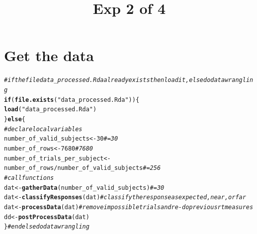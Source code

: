 \documentclass[a4paper,12pt,twoside]{article}\usepackage[]{graphicx}\usepackage[]{color}
\title{Exp 2 of 4}
\makeatletter
\newcommand{\hlnum}[1]{\textcolor[rgb]{0.686,0.059,0.569}{#1}}%
\newcommand{\hlstr}[1]{\textcolor[rgb]{0.192,0.494,0.8}{#1}}%
\newcommand{\hlcom}[1]{\textcolor[rgb]{0.678,0.584,0.686}{\textit{#1}}}%
\newcommand{\hlopt}[1]{\textcolor[rgb]{0,0,0}{#1}}%
\newcommand{\hlstd}[1]{\textcolor[rgb]{0.345,0.345,0.345}{#1}}%
\newcommand{\hlkwa}[1]{\textcolor[rgb]{0.161,0.373,0.58}{\textbf{#1}}}%
\newcommand{\hlkwb}[1]{\textcolor[rgb]{0.69,0.353,0.396}{#1}}%
\newcommand{\hlkwd}[1]{\textcolor[rgb]{0.737,0.353,0.396}{\textbf{#1}}}%
\newenvironment{kframe}{%
 \def\at@end@of@kframe{}%
 \ifinner\ifhmode%
  \def\at@end@of@kframe{\end{minipage}}%
  \begin{minipage}{\columnwidth}%
 \fi\fi%
 \def\FrameCommand##1{\hskip\@totalleftmargin \hskip-\fboxsep
 \colorbox{shadecolor}{##1}\hskip-\fboxsep
     \hskip-\linewidth \hskip-\@totalleftmargin \hskip\columnwidth}%
 \MakeFramed {\advance\hsize-\width
   \@totalleftmargin\z@ \linewidth\hsize
   \@setminipage}}%
 {\par\unskip\endMakeFramed%
 \at@end@of@kframe}
\newenvironment{knitrout}{}{} %
\makeatother
\begin{document}
\maketitle
\tableofcontents
\clearpage














\clearpage
\section{Get the data}

\begin{knitrout}\scriptsize
{}\color{fgcolor}\begin{kframe}
\begin{alltt}
\hlcom{# if the file data_processed.Rda already exists then load it, else do data wrangling}
\hlkwa{if} \hlstd{(}\hlkwd{file.exists}\hlstd{(}\hlstr{"data_processed.Rda"}\hlstd{)) \{}
    \hlkwd{load}\hlstd{(}\hlstr{"data_processed.Rda"}\hlstd{)}
\hlstd{\}} \hlkwa{else} \hlstd{\{}
    \hlcom{# declare local variables}
    \hlstd{number_of_valid_subjects} \hlkwb{<-} \hlnum{30}  \hlcom{# = 30}
    \hlstd{number_of_rows} \hlkwb{<-} \hlnum{7680}  \hlcom{# 7680}
    \hlstd{number_of_trials_per_subject} \hlkwb{<-} \hlstd{number_of_rows}\hlopt{/}\hlstd{number_of_valid_subjects}  \hlcom{# = 256}
    \hlcom{# call functions}
    \hlstd{dat} \hlkwb{<-} \hlkwd{gatherData}\hlstd{(number_of_valid_subjects)}  \hlcom{# = 30}
    \hlstd{dat} \hlkwb{<-} \hlkwd{classifyResponses}\hlstd{(dat)}  \hlcom{# classify the response as expected, near, or far}
    \hlstd{dat} \hlkwb{<-} \hlkwd{processData}\hlstd{(dat)}  \hlcom{# remove impossible trials and re-do previous rt measures}
    \hlstd{dd} \hlkwb{<-} \hlkwd{postProcessData}\hlstd{(dat)}
\hlstd{\}}  \hlcom{# end else do data wrangling}
\end{alltt}
\end{kframe}
\end{knitrout}

\clearpage
\end{document}
